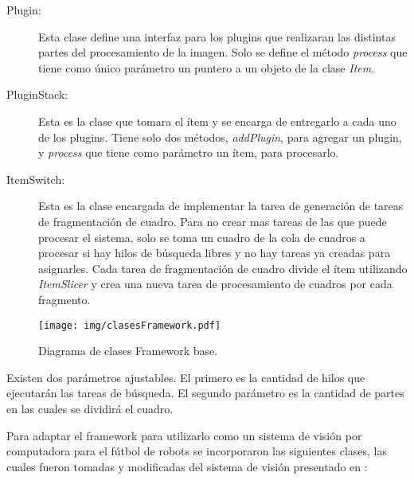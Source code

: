 \begin{description}
	\item[Plugin:] Esta clase define una interfaz para los plugins que
		realizaran las distintas partes del procesamiento de la imagen.
		Solo se define el método \emph{process} que tiene como único
		parámetro un puntero a un objeto de la clase \emph{Item}.

	\item[PluginStack:] Esta es la clase que tomara el ítem y se encarga de
		entregarlo a cada uno de los plugins. Tiene solo dos métodos,
		\emph{addPlugin}, para agregar un plugin, y \emph{process} que
		tiene como parámetro un ítem, para procesarlo.

	\item[ItemSwitch:] Esta es la clase encargada de implementar la tarea de
		generación de tareas de fragmentación de cuadro. Para no crear
		mas tareas de las que puede procesar el sistema, solo se toma un
		cuadro de la cola de cuadros a procesar si hay hilos de búsqueda
		libres y no hay tareas ya creadas para asignarles. Cada tarea de
		fragmentación de cuadro divide el ítem utilizando
		\emph{ItemSlicer} y crea una nueva tarea de procesamiento de
		cuadros por cada fragmento.

\end{description}

\begin{figure}[h]

	\texttt{[image: img/clasesFramework.pdf]}

	\caption{Diagrama de clases Framework base.}

\end{figure}

Existen dos parámetros ajustables. El primero es la cantidad de hilos que
ejecutarán las tareas de búsqueda. El segundo parámetro es la cantidad de partes
en las cuales se dividirá el cuadro.

Para adaptar el framework para utilizarlo como un sistema de visión por
computadora para el fútbol de robots se incorporaron las siguientes clases, las
cuales fueron tomadas y modificadas del sistema de visión presentado en
\cite{torres2014}:

